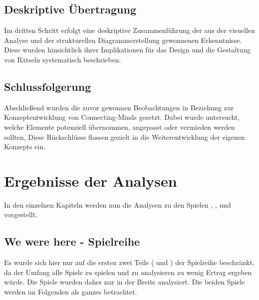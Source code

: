 \subsection{Deskriptive Übertragung}
Im dritten Schritt erfolgt eine deskriptive Zusammenführung der aus der visuellen Analyse und der strukturellen Diagrammerstellung gewonnenen Erkenntnisse. Diese wurden hinsichtlich ihrer Implikationen für das Design und die Gestaltung von Rätseln systematisch beschrieben.

\subsection{Schlussfolgerung}
Abschließend wurden die zuvor gewonnen Beobachtungen in Beziehung zur Konzeptentwicklung von Connecting-Minds gesetzt. Dabei wurde untersucht, welche Elemente potenziell übernommen, angepasst oder vermieden werden sollten, Diese Rückschlüsse flossen gezielt in die Weiterentwicklung der eigenen Konzepts ein.

\section{Ergebnisse der Analysen}
In den einzelnen Kapiteln werden nun die Analysen zu den Spielen , ,  und  vorgestellt.

\subsection{We were here - Spielreihe}
Es wurde sich hier nur auf die ersten zwei Teile ( und ) der Spielreihe beschränkt, da der Umfang alle Spiele zu spielen und zu analysieren zu wenig Ertrag ergeben würde. Die Spiele wurden daher nur in der Breite  analysiert. Die beiden Spiele werden im Folgenden als ganzes betrachtet.

